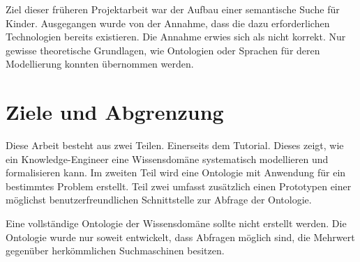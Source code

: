 Ziel dieser früheren Projektarbeit war der Aufbau einer semantische Suche für Kinder. Ausgegangen wurde von der Annahme, dass die dazu erforderlichen Technologien bereits existieren. Die Annahme erwies sich als nicht korrekt. Nur gewisse theoretische Grundlagen, wie Ontologien oder Sprachen für deren Modellierung konnten übernommen werden.

\section{Ziele und Abgrenzung}
\label{sec:aufgabe_ziele}
Diese Arbeit besteht aus zwei Teilen. Einerseits dem Tutorial. Dieses zeigt, wie ein Knowledge-Engineer eine Wissensdomäne systematisch modellieren und formalisieren kann. Im zweiten Teil wird eine Ontologie mit Anwendung für ein bestimmtes Problem erstellt. Teil zwei umfasst zusätzlich einen Prototypen einer möglichst benutzerfreundlichen Schnittstelle zur Abfrage der Ontologie.

Eine vollständige Ontologie der Wissensdomäne sollte nicht erstellt werden. Die Ontologie wurde nur soweit entwickelt, dass Abfragen möglich sind, die Mehrwert gegenüber herkömmlichen Suchmaschinen besitzen.
